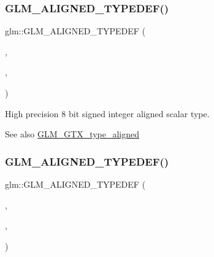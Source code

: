 \subsubsection{\texorpdfstring{G\+L\+M\+\_\+\+A\+L\+I\+G\+N\+E\+D\+\_\+\+T\+Y\+P\+E\+D\+E\+F()}{GLM\_ALIGNED\_TYPEDEF()}\hspace{0.1cm}{\footnotesize\ttfamily [25/209]}}
{\footnotesize\ttfamily glm\+::\+G\+L\+M\+\_\+\+A\+L\+I\+G\+N\+E\+D\+\_\+\+T\+Y\+P\+E\+D\+EF (\begin{DoxyParamCaption}\item[{\hyperlink{group__gtc__type__precision_ga57c86999e666760c304453f9bfdc09d1}{highp\+\_\+int8}}]{,  }\item[{aligned\+\_\+highp\+\_\+int8}]{,  }\item[{1}]{ }\end{DoxyParamCaption})}

High precision 8 bit signed integer aligned scalar type. \begin{DoxySeeAlso}{See also}
\hyperlink{group__gtx__type__aligned}{G\+L\+M\+\_\+\+G\+T\+X\+\_\+type\+\_\+aligned} 
\end{DoxySeeAlso}
\mbox{\label{group__gtx__type__aligned_ga7a751b3aff24c0259f4a7357c2969089}} 
\subsubsection{\texorpdfstring{G\+L\+M\+\_\+\+A\+L\+I\+G\+N\+E\+D\+\_\+\+T\+Y\+P\+E\+D\+E\+F()}{GLM\_ALIGNED\_TYPEDEF()}\hspace{0.1cm}{\footnotesize\ttfamily [26/209]}}
{\footnotesize\ttfamily glm\+::\+G\+L\+M\+\_\+\+A\+L\+I\+G\+N\+E\+D\+\_\+\+T\+Y\+P\+E\+D\+EF (\begin{DoxyParamCaption}\item[{\hyperlink{group__gtc__type__precision_gaf0430ed80e88c0d1dfbe47f359659c81}{highp\+\_\+int16}}]{,  }\item[{aligned\+\_\+highp\+\_\+int16}]{,  }\item[{2}]{ }\end{DoxyParamCaption})}

